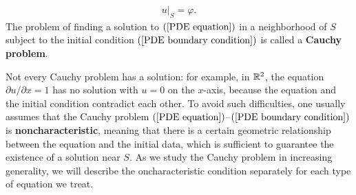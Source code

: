 \begin{align}\label{PDE boundary condition}
u|_S=\varphi.
\end{align}
The problem of finding a solution to $(\ref{PDE equation})$ in a neighborhood of $S$ subject to the initial condition $(\ref{PDE boundary condition})$ is called a \textbf{Cauchy problem}.\par
Not every Cauchy problem has a solution: for example, in $\mathbb{R}^2$, the equation $\partial u/\partial x=1$ has no solution with $u=0$ on the $x$-axis, because the equation and the initial condition contradict each other. To avoid such difficulties, one usually assumes that the Cauchy problem $(\ref{PDE equation})$--$(\ref{PDE boundary condition})$ is \textbf{noncharacteristic}, meaning that there is a certain geometric relationship between the equation and the initial data, which is sufficient to guarantee the existence of a solution near $S$. As we study
the Cauchy problem in increasing generality, we will describe the oncharacteristic condition separately for each type of equation we treat.

